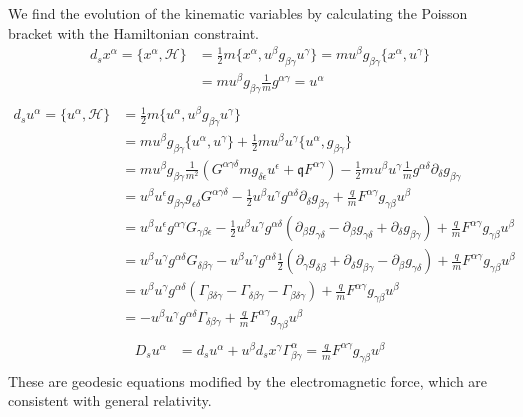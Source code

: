 We find the evolution of the kinematic variables by calculating the Poisson bracket with the Hamiltonian constraint.
\begingroup
\allowdisplaybreaks
\begin{equation}
	\begin{aligned}
		d_s x^\alpha = \{x^\alpha, \mathcal{H}\} &= \frac{1}{2} m  \{x^\alpha, u^\beta g_{\beta\gamma} u^\gamma\} = m u^\beta g_{\beta \gamma} \{x^\alpha, u^\gamma\}\\
		&= m u^\beta g_{\beta\gamma} \frac{1}{m} g^{\alpha\gamma} = u^\alpha \\
	\end{aligned}
\end{equation}
	\begin{align*}
		d_s u^\alpha = \{ u^\alpha , \mathcal{H} \} &= \frac{1}{2} m \{u^\alpha, u^\beta g_{\beta\gamma} u^\gamma\} \\
		&=  m u^\beta g_{\beta\gamma} \{u^\alpha,  u^\gamma\} + \frac{1}{2} m u^\beta u^\gamma \{u^\alpha,  g_{\beta\gamma} \} \\
		&= m u^\beta g_{\beta\gamma} \frac{1}{m^2} (G^{\alpha \gamma \delta} m g_{\delta \epsilon} u^\epsilon +  \mathfrak{q} F^{\alpha \gamma}) - \frac{1}{2} m u^\beta u^\gamma \frac{1}{m} g^{\alpha \delta} \partial_\delta g_{\beta\gamma} \\
		&= u^\beta u^\epsilon g_{\beta\gamma} g_{\epsilon \delta} G^{\alpha \gamma \delta} - \frac{1}{2} u^\beta u^\gamma g^{\alpha \delta} \partial_\delta g_{\beta\gamma} + \frac{q}{m} F^{\alpha \gamma}g_{\gamma\beta}u^\beta \\
		&= u^\beta u^\epsilon g^{\alpha\gamma} G_{\gamma \beta \epsilon} - \frac{1}{2} u^\beta u^\gamma g^{\alpha \delta} (\partial_\beta g_{\gamma\delta} - \partial_\beta g_{\gamma\delta} + \partial_\delta g_{\beta\gamma}) + \frac{q}{m} F^{\alpha \gamma}g_{\gamma\beta}u^\beta \\
		&= u^\beta u^\gamma g^{\alpha\delta} G_{\delta \beta \gamma} -  u^\beta u^\gamma g^{\alpha \delta} \frac{1}{2} (\partial_\gamma g_{\delta\beta} + \partial_\delta g_{\beta\gamma} - \partial_\beta g_{\gamma\delta}) + \frac{q}{m} F^{\alpha \gamma}g_{\gamma\beta}u^\beta \\
		&= u^\beta u^\gamma g^{\alpha\delta} (\Gamma_{\beta \delta \gamma} - \Gamma_{\delta \beta \gamma} - \Gamma_{\beta \delta \gamma}) + \frac{q}{m} F^{\alpha \gamma}g_{\gamma\beta}u^\beta \\
		&= - u^\beta u^\gamma g^{\alpha\delta} \Gamma_{\delta \beta \gamma} + \frac{q}{m} F^{\alpha \gamma}g_{\gamma\beta}u^\beta \\
	\end{align*}
\begin{equation}
	\begin{aligned}
		D_s u^\alpha &= d_s u^\alpha + u^\beta d_sx^\gamma \Gamma^\alpha_{\beta\gamma} = \frac{q}{m} F^{\alpha \gamma}g_{\gamma\beta}u^\beta \\
	\end{aligned}
\end{equation}
\endgroup
These are geodesic equations modified by the electromagnetic force, which are consistent with general relativity.

